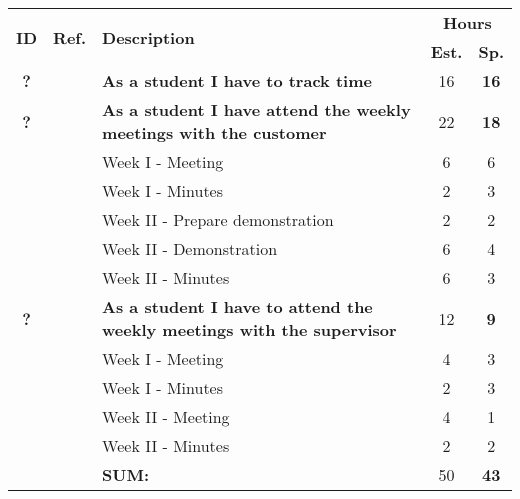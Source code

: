 \label{tab:sprint2storiesProcess}
\def\arraystretch{1.25}
 
\begin{longtable}{ccXcc}

\toprule[0.5mm]
\multirow{2}{*}{\textbf{ID}} &
\multirow{2}{*}{\textbf{Ref.}} & \multirow{2}{*}{\textbf{Description}} & \multicolumn{2}{c}{\textbf{Hours}} \\
 					& & & \textbf{Est.} & \textbf{Sp.} \\
\midrule

\textbf{?} 	&& {\bf  As a student I have to track time} 										& 	16	& \textbf{16} \\
	
\textbf{?} 	&& {\bf As a student I have attend the weekly meetings with the customer} 			& 	22	& \textbf{18} \\
		&& Week I - Meeting							&  6 & 6 \\
		&& Week I - Minutes							&  2 & 3 \\
		&& Week II - Prepare demonstration			&  2 & 2 \\
		&& Week II - Demonstration					&  6 & 4 \\
		&& Week II - Minutes						&  6 & 3 \\


		
\textbf{?} 	&& {\bf As a student I have to attend the weekly meetings with the supervisor} 		& 	12	& \textbf{9} \\
		&& Week I - Meeting							&  4 & 3 \\
		&& Week I - Minutes							&  2 & 3 \\
		&& Week II - Meeting						&  4 & 1 \\
		&& Week II - Minutes						&  2 & 2 \\
				
				
\hline
				&& \textbf{SUM:}		&		50	& \textbf{43}
 \\																			
\bottomrule[0.5mm]
\end{longtable}
